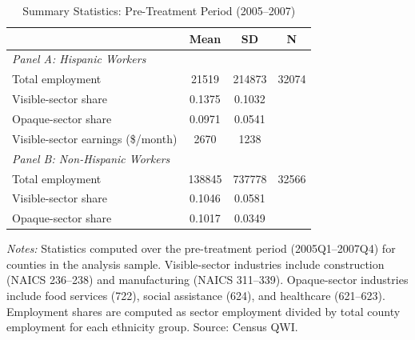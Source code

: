 \begin{table}[htbp]
\centering
\begin{threeparttable}
\caption{Summary Statistics: Pre-Treatment Period (2005--2007)}
\label{tab:sumstats}
\begin{tabular}{lccc}
\toprule
 & Mean & SD & N \\
\midrule
\textit{Panel A: Hispanic Workers} & & & \\
Total employment & 21519 & 214873 & 32074 \\
Visible-sector share & 0.1375 & 0.1032 &  \\
Opaque-sector share & 0.0971 & 0.0541 &  \\
Visible-sector earnings (\$/month) & 2670 & 1238 &  \\
\addlinespace
\textit{Panel B: Non-Hispanic Workers} & & & \\
Total employment & 138845 & 737778 & 32566 \\
Visible-sector share & 0.1046 & 0.0581 &  \\
Opaque-sector share & 0.1017 & 0.0349 &  \\
\bottomrule
\end{tabular}
\begin{tablenotes}[flushleft]
\small
\item \textit{Notes:} Statistics computed over the pre-treatment period (2005Q1--2007Q4) for counties in the analysis sample. Visible-sector industries include construction (NAICS 236--238) and manufacturing (NAICS 311--339). Opaque-sector industries include food services (722), social assistance (624), and healthcare (621--623). Employment shares are computed as sector employment divided by total county employment for each ethnicity group. Source: Census QWI.
\end{tablenotes}
\end{threeparttable}
\end{table}
